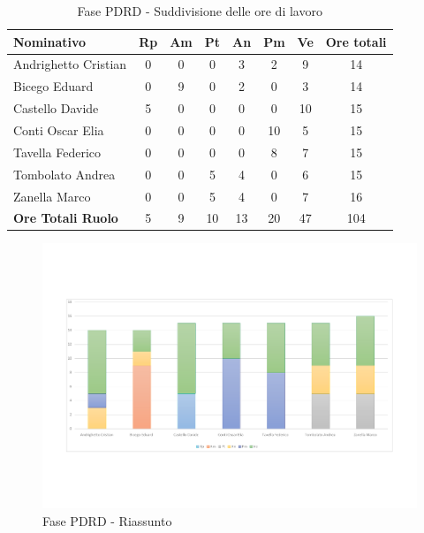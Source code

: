 \documentclass[../PianoProgetto.tex]{subfiles}
\begin{document}
	\begin{table}[H]
	
		\begin{tabularx}{\textwidth}{l  * {6}{C}  c}
			\toprule
			\textbf{Nominativo} & \textbf{Rp} & \textbf{Am} & \textbf{Pt} 
						& \textbf{An} & \textbf{Pm} & \textbf{Ve} & \textbf{Ore totali} \\
			\midrule
			Andrighetto Cristian  & 0 & 0 & 0 & 3 & 2 & 9 & 14 \\
			Bicego Eduard  & 0 & 9 & 0 & 2 & 0 & 3 & 14 \\
			Castello Davide  & 5 & 0 & 0 & 0 & 0 & 10 & 15 \\
			Conti Oscar Elia  & 0 & 0 & 0 & 0 & 10 & 5 & 15 \\
			Tavella Federico  & 0 & 0 & 0 & 0 & 8 & 7 & 15 \\
			Tombolato Andrea  & 0 & 0 & 5 & 4 & 0 & 6 & 15 \\
			Zanella Marco & 0 & 0 & 5 & 4 & 0 & 7 & 16 \\
			\midrule
			\textbf{Ore Totali Ruolo} & 5 & 9 & 10 & 13 & 20 & 47 & 104 \\
			\bottomrule
			
		\end{tabularx}
		\caption{Fase PDRD - Suddivisione delle ore di lavoro}
		\label{tab:fasePDRD_ore}
	\end{table}
\vfill	
		
	\begin{figure}[H]
		\centering
		\includegraphics[width=\textwidth , trim=2cm 4cm 2cm 4cm]{grafici/PDRD/PDRD-ore-persona}
			\caption{Fase PDRD - Riassunto}
		\label{fig:BarChart-fasePDRD_ore}
	\end{figure}
\vfill	
\newpage	
	
\end{document}
